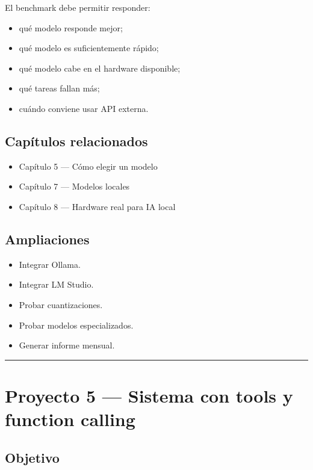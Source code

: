 El benchmark debe permitir responder:

\begin{itemize}
\tightlist
\item
  qué modelo responde mejor;
\item
  qué modelo es suficientemente rápido;
\item
  qué modelo cabe en el hardware disponible;
\item
  qué tareas fallan más;
\item
  cuándo conviene usar API externa.
\end{itemize}

\subsection{Capítulos relacionados}\label{capuxedtulos-relacionados-3}

\begin{itemize}
\tightlist
\item
  Capítulo 5 --- Cómo elegir un modelo
\item
  Capítulo 7 --- Modelos locales
\item
  Capítulo 8 --- Hardware real para IA local
\end{itemize}

\subsection{Ampliaciones}\label{ampliaciones-3}

\begin{itemize}
\tightlist
\item
  Integrar Ollama.
\item
  Integrar LM Studio.
\item
  Probar cuantizaciones.
\item
  Probar modelos especializados.
\item
  Generar informe mensual.
\end{itemize}

\begin{center}\rule{0.5\linewidth}{0.5pt}\end{center}

\section{Proyecto 5 --- Sistema con tools y function
calling}\label{proyecto-5-sistema-con-tools-y-function-calling}

\subsection{Objetivo}\label{objetivo-7}

